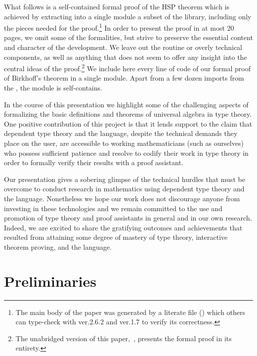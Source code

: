 What follows is a self-contained formal proof of the HSP theorem which is achieved by
extracting into a single \agda module a subset of the \agdaalgebras library, including only
the pieces needed for the proof.\footnote{The main body of the paper was generated by a literate
\agda file (\HSPlagda) which others can type-check with \agda ver.2.6.2 and \agdastdlib ver.1.7 to
verify its correctness.}
\ifshort
In order to present the proof in at most 20 pages, we omit some of the formalities,
but strive to preserve the essential content and character of the development.
We leave out the routine or overly technical components, as well as anything that does not
seem to offer any insight into the central ideas of the proof.\footnote{The unabridged
version of this paper,~\cite{DeMeo:2021}, presents the formal proof in its entirety.}
\else
We include here every line of code of our formal proof of Birkhoff's theorem
in a single \agda module.  Apart from a few dozen imports from the \agdastdlib, the module
is self-contains.
\fi

In the course of this presentation we highlight some of the challenging aspects of
formalizing the basic definitions and theorems of universal algebra in type theory.
One positive contribution of this project is that it lends support to the claim that
dependent type theory and the \agda language, despite the technical demands they place on
the user, are accessible to working mathematicians (such as ourselves) who possess
sufficient patience and resolve to codify their work in type theory in order to formally verify
their results with a proof assistant.

\ifshort\else
Our presentation gives a sobering glimpse of the technical hurdles that must be overcome
to conduct research in mathematics using dependent type theory and the \agda language.
Nonetheless we hope our work does not discourage anyone from investing in these
technologies and we remain committed to the use and promotion of type theory and proof
assistants in general and in our own research. Indeed, we are excited to share the
gratifying outcomes and achievements that resulted from attaining some degree of mastery
of type theory, interactive theorem proving, and the \agda language.
\fi

\section{Preliminaries}


